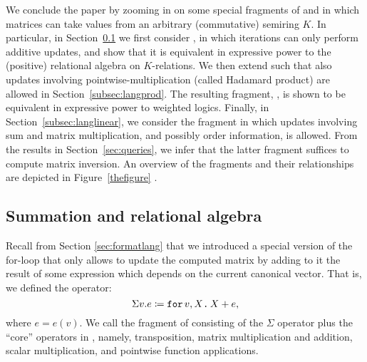 We conclude the paper by zooming in on some special fragments of \langfor and in which matrices can take values from an arbitrary (commutative) semiring $K$. In particular, in Section~\ref{ss:sumML} we first consider \langsum, in which iterations can only perform
additive updates, and show that it is equivalent in expressive power to the (positive)
relational algebra on $K$-relations. We then extend \langsum such that also updates involving pointwise-multiplication (called Hadamard product) are allowed in Section~\ref{subsec:langprod}. The resulting fragment, \langprod, is shown to be equivalent in expressive power to weighted logics. Finally, in Section~\ref{subsec:langlinear}, we consider the fragment \langmprod in which updates involving sum and matrix multiplication, and possibly order information, is allowed. From the results in Section~\ref{sec:queries}, we infer that the latter fragment suffices to compute matrix inversion. An overview of the fragments and their relationships are depicted in Figure~\ref{thefigure} .

\subsection{Summation \lang and relational algebra}
\label{ss:sumML}

Recall from Section \ref{sec:formatlang} that we introduced a special version of the for-loop that only allows to update the computed matrix by adding to it the result of some expression which depends on the current canonical vector. 
  That is, we defined the operator:
$$\Sigma v. e \coloneqq  \texttt{for}\, v,X \texttt{.}\, X + e,$$
where $e = e(v)$. We call \langsum the fragment of \langfor consisting of 
 the $\Sigma$ operator plus the ``core'' operators in \lang, namely, transposition, matrix multiplication and addition, scalar multiplication, and pointwise function applications.

